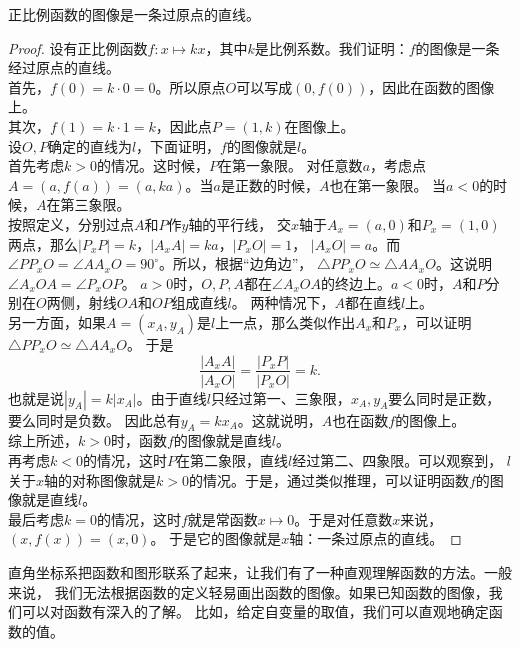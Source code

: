 \documentclass[12pt,UTF8]{ctexbook}
\begin{document}
\begin{tm}\label{tm:5-0-0}
    正比例函数的图像是一条过原点的直线。
\end{tm}
\begin{proof}
    设有正比例函数$f: x \mapsto kx$，其中$k$是比例系数。我们证明：$f$的图像是一条经过原点的直线。\\
    首先，$f(0) = k\cdot 0 = 0$。所以原点$O$可以写成$(0, f(0))$，因此在函数的图像上。\\
    其次，$f(1) = k\cdot 1 = k$，因此点$P = (1, k)$在图像上。\\
    设$O,P$确定的直线为$l$，下面证明，$f$的图像就是$l$。\\
    首先考虑$k > 0$的情况。这时候，$P$在第一象限。
    对任意数$a$，考虑点$A = (a, f(a)) = (a, ka)$。当$a$是正数的时候，$A$也在第一象限。
    当$a < 0$的时候，$A$在第三象限。\\
    按照定义，分别过点$A$和$P$作$y$轴的平行线，
    交$x$轴于$A_x = (a, 0)$和$P_x = (1, 0)$两点，那么$|P_xP| = k$，$|A_xA| = ka$，$|P_xO| = 1$，
    $|A_xO| = a$。而$\angle PP_xO = \angle AA_xO = 90^\circ$。所以，根据“边角边”，
    $\triangle PP_xO \simeq \triangle AA_xO$。这说明$\angle A_xOA = \angle P_xOP$。
    $a>0$时，$O,P,A$都在$\angle A_xOA$的终边上。$a<0$时，$A$和$P$分别在$O$两侧，射线$OA$和$OP$组成直线$l$。
    两种情况下，$A$都在直线$l$上。\\
    另一方面，如果$A = (x_A, y_A)$是$l$上一点，那么类似作出$A_x$和$P_x$，可以证明$\triangle PP_xO \simeq \triangle AA_xO$。
    于是
    $$ \frac{|A_xA|}{|A_xO|} = \frac{|P_xP|}{|P_xO|} = k.$$
    也就是说$|y_A| = k|x_A|$。由于直线$l$只经过第一、三象限，$x_A, y_A$要么同时是正数，要么同时是负数。
    因此总有$y_A = kx_A$。这就说明，$A$也在函数$f$的图像上。\\
    综上所述，$k>0$时，函数$f$的图像就是直线$l$。\\
    再考虑$k<0$的情况，这时$P$在第二象限，直线$l$经过第二、四象限。可以观察到，
    $l$关于$x$轴的对称图像就是$k>0$的情况。于是，通过类似推理，可以证明函数$f$的图像就是直线$l$。\\
    最后考虑$k=0$的情况，这时$f$就是常函数$x\mapsto 0$。于是对任意数$x$来说，$(x, f(x)) = (x, 0)$。
    于是它的图像就是$x$轴：一条过原点的直线。
\end{proof}

直角坐标系把函数和图形联系了起来，让我们有了一种直观理解函数的方法。一般来说，
我们无法根据函数的定义轻易画出函数的图像。如果已知函数的图像，我们可以对函数有深入的了解。
比如，给定自变量的取值，我们可以直观地确定函数的值。
\end{document}

